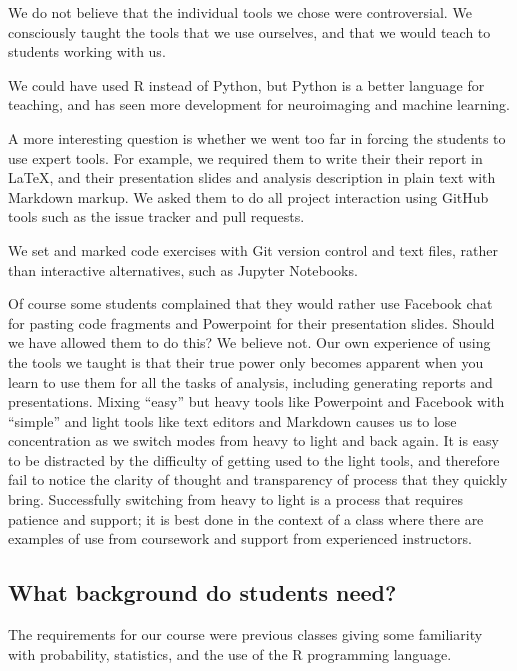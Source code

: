 We do not believe that the individual tools we chose were controversial. We
consciously taught the tools that we use ourselves, and that we would teach to
students working with us.

We could have used R instead of Python, but Python is a better language for
teaching, and has seen more development for neuroimaging and machine learning.

A more interesting question is whether we went too far in forcing the students
to use expert tools.  For example, we required them to write their their
report in \LaTeX, and their presentation slides and analysis description in
plain text with Markdown markup.  We asked them to do all project interaction
using GitHub tools such as the issue tracker and pull requests.

We set and marked code exercises with Git version control and text files,
rather than interactive alternatives, such as Jupyter Notebooks.

Of course some students complained that they would rather use Facebook chat
for pasting code fragments and Powerpoint for their presentation slides.
Should we have allowed them to do this?  We believe not.  Our own experience
of using the tools we taught is that their true power only becomes apparent
when you learn to use them for all the tasks of analysis, including generating
reports and presentations.  Mixing ``easy'' but heavy tools like Powerpoint
and Facebook with ``simple'' and light tools like text editors and Markdown
causes us to lose concentration as we switch modes from heavy to light and
back again. It is easy to be distracted by the difficulty of getting used to
the light tools, and therefore fail to notice the clarity of thought and
transparency of process that they quickly bring.  Successfully switching from
heavy to light is a process that requires patience and support; it is best
done in the context of a class where there are examples of use from coursework
and support from experienced instructors.


\subsection{What background do students need?}

The requirements for our course were previous classes giving some familiarity
with probability, statistics, and the use of the R programming language.

